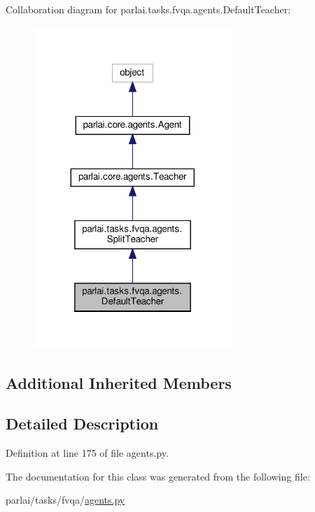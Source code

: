 Collaboration diagram for parlai.\+tasks.\+fvqa.\+agents.\+Default\+Teacher\+:
\nopagebreak
\begin{figure}[H]
\begin{center}
\leavevmode
\includegraphics[width=212pt]{dd/dd1/classparlai_1_1tasks_1_1fvqa_1_1agents_1_1DefaultTeacher__coll__graph}
\end{center}
\end{figure}
\subsection*{Additional Inherited Members}


\subsection{Detailed Description}


Definition at line 175 of file agents.\+py.



The documentation for this class was generated from the following file\+:\begin{DoxyCompactItemize}
\item 
parlai/tasks/fvqa/\hyperlink{parlai_2tasks_2fvqa_2agents_8py}{agents.\+py}\end{DoxyCompactItemize}
